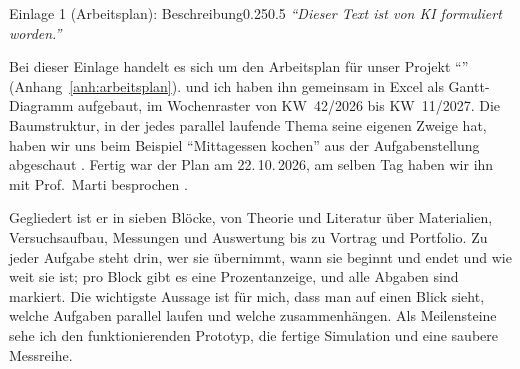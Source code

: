 \begin{umfang}{Einlage 1 (Arbeitsplan): Beschreibung}{0.25}{0.5}
\noindent\emph{\enquote{Dieser Text ist von KI formuliert worden.}}~\cite{Manevski2026KIArbeitsplan}

Bei dieser Einlage handelt es sich um den Arbeitsplan für unser Projekt \enquote{\Projekt}
(Anhang~\ref{anh:arbeitsplan}). \Partner{} und ich haben ihn gemeinsam in Excel als Gantt-Diagramm
aufgebaut, im Wochenraster von KW~42/2026 bis KW~11/2027. Die Baumstruktur, in der jedes parallel laufende
Thema seine eigenen Zweige hat, haben wir uns beim Beispiel \enquote{Mittagessen kochen} aus der
Aufgabenstellung abgeschaut \cite{MoodleArbeitsplan2026}. Fertig war der Plan am 22.\,10.\,2026, am
selben Tag haben wir ihn mit Prof.~Marti besprochen \cite{Marti2026Gespraech}.

Gegliedert ist er in sieben Blöcke, von Theorie und Literatur über Materialien, Versuchsaufbau, Messungen
und Auswertung bis zu Vortrag und Portfolio. Zu jeder Aufgabe steht drin, wer sie übernimmt, wann sie
beginnt und endet und wie weit sie ist; pro Block gibt es eine Prozentanzeige, und alle Abgaben sind
markiert. Die wichtigste Aussage ist für mich, dass man auf einen Blick sieht, welche Aufgaben parallel
laufen und welche zusammenhängen. Als Meilensteine sehe ich den funktionierenden Prototyp, die fertige
Simulation und eine saubere Messreihe.
\end{umfang}

